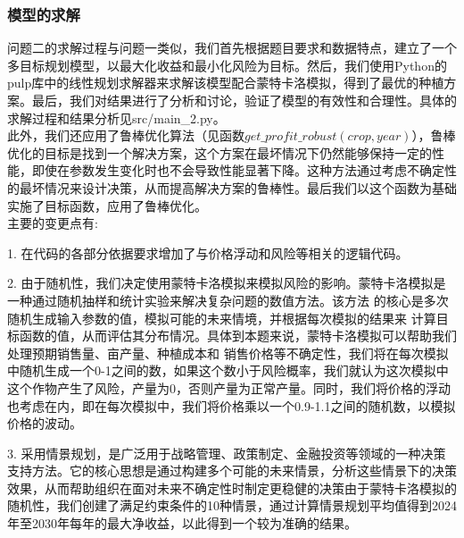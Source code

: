 \documentclass{cumcmthesis}
\begin{document}
\subsubsection{模型的求解}
问题二的求解过程与问题一类似，我们首先根据题目要求和数据特点，建立了一个多目标规划模型，以最大化收益和最小化风险为目标。然后，我们使用Python的pulp库中的线性规划求解器来求解该模型配合蒙特卡洛模拟，得到了最优的种植方案。最后，我们对结果进行了分析和讨论，验证了模型的有效性和合理性。具体的求解过程和结果分析见src/main\_2.py。\\

此外，我们还应用了鲁棒优化算法（见函数$ get\_profit\_robust(crop, year) $），鲁棒优化的目标是找到一个解决方案，这个方案在最坏情况下仍然能够保持一定的性能，即使在参数发生变化时也不会导致性能显著下降。这种方法通过考虑不确定性的最坏情况来设计决策，从而提高解决方案的鲁棒性。最后我们以这个函数为基础实施了目标函数，应用了鲁棒优化。\\

主要的变更点有:

1. 在代码的各部分依据要求增加了与价格浮动和风险等相关的逻辑代码。

2. 由于随机性，我们决定使用蒙特卡洛模拟来模拟风险的影响。蒙特卡洛模拟是一种通过随机抽样和统计实验来解决复杂问题的数值方法。该方法 的核心是多次随机生成输入参数的值，模拟可能的未来情境，并根据每次模拟的结果来 计算目标函数的值，从而评估其分布情况。具体到本题来说，蒙特卡洛模拟可以帮助我们处理预期销售量、亩产量、种植成本和 销售价格等不确定性，我们将在每次模拟中随机生成一个0-1之间的数，如果这个数小于风险概率，我们就认为这次模拟中这个作物产生了风险，产量为0，否则产量为正常产量。同时，我们将价格的浮动也考虑在内，即在每次模拟中，我们将价格乘以一个0.9-1.1之间的随机数，以模拟价格的波动。

3. 采用情景规划，是广泛用于战略管理、政策制定、金融投资等领域\cite{ref6}的一种决策支持方法。它的核心思想是通过构建多个可能的未来情景，分析这些情景下的决策效果，从而帮助组织在面对未来不确定性时制定更稳健的决策\cite{ref7}由于蒙特卡洛模拟的随机性，我们创建了满足约束条件的10种情景，通过计算情景规划平均值得到2024年至2030年每年的最大净收益，以此得到一个较为准确的结果。
\end{document}
